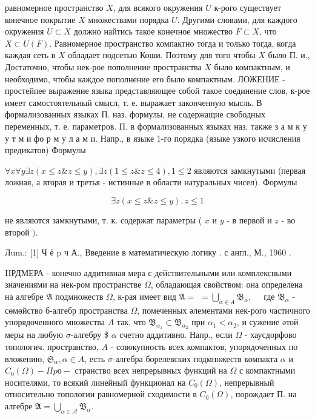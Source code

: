\documentclass[10pt]{article}
\begin{document}
равномерное пространство $X$, для всякого окружения $U$ к-рого существует конечное покрытие $X$ множествами порядка $U$. Другими словами, для каждого окружения $U \subset X$ должно найтись такое конечное множество $F \subset X$, что $X \subset U(F)$. Равномерное пространство компактно тогда и только тогда, когда каждая сеть в $X$ обладает подсетью Коши. Поэтому для того чтобы $X$ было П. и., Достаточно, чтобы нек-рое пополнение пространства $X$ было компактным, и необходимо, чтобы каждое пополнение его было компактным. ЛОЖЕНИЕ - простейпее выражение языка представляющее собой такое соединение слов, к-рое имеет самостоятельный смысл, т. е. выражает законченную мысль. В формализованных языках П. наз. формулы, не содержащие свободных переменных, т. е. параметров. П. в формализованных языках наз. также з а м к у у т м и фо р м у л а м и. Напр., в языке 1-го порядка (языке узкого исчисления предикатов) Формулы



$\forall x \forall y \exists z(x \leqslant z \& z \leqslant y), \exists z(1 \leqslant z \& z \leqslant 4), 1 \leqslant 2$ являются замкнутыми (первая ложная, а вторая и третья - истинные в области натуральных чисел). Формулы



\[

\exists z(x \leqslant z \& z \leqslant y), z \leqslant 1

\]



не являются замкнутыми, т. к. содержат параметры ( $x$ и $y$ - в первой и $z$ - во второй $)$.



Лum.: [1] Ч ё p ч А., Введение в математическую логику . с англ., М., 1960 .



IIРДМЕРА - конечно аддитивная мера с действительными или комплексными значениями на нек-ром пространстве $\Omega$, обладающая свойством: она определена на алгебре $\mathfrak{A}$ подмножеств $\Omega$, к-рая имеет вид $\mathfrak{A}=$ $=\bigcup_{\alpha \in A} \mathfrak{B}_{\alpha}, \quad$ где $\mathfrak{B}_{\alpha}$ - сөмөйство б-алгебр пространства $\Omega$, помеченных әлементами нек-рого частичного упорядоченного множества $A$ так, что $\mathfrak{B}_{\alpha_{1}} \subset \mathfrak{B}_{\alpha_{2}}$ при $\alpha_{1}<\alpha_{2}$, и сужение әтой меры на любую $\sigma$-алгебру \$ $\alpha$ счетно аддитивно. Напр., өсли $\Omega$ - хаусдорфово топологич. пространство, $A$ - совокупность всех компактов, упорядоченных по вложению, $\mathfrak{S}_{\alpha}, \alpha \in A$, есть $\sigma$-алгебра борелевских подмножеств компакта $\alpha$ и $C_{0}(\Omega)-\Pi p о-$ странство всех непрерывных функций на $\Omega$ с компактными носителями, то всякий линейный функционал на $C_{0}(\Omega)$, непрерывный относительно топологии равномерной сходимости в $C_{0}(\Omega)$, порождает П. на алгебре $\mathfrak{A}=\bigcup_{\alpha \in \mathcal{A}} \mathfrak{B}_{\alpha}$.
\end{document}
